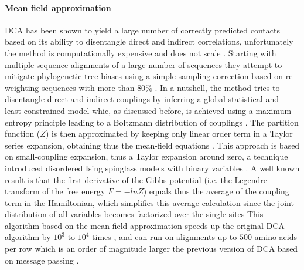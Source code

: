 \paragraph{Mean field approximation}
DCA has been shown to yield a large number of correctly predicted contacts based on its ability to disentangle direct and indirect correlations, unfortunately the method is computationally expensive and does not scale \cite{morcos2011direct}.
Starting with multiple-sequence alignments of a large number of sequences they attempt to mitigate phylogenetic tree biases using a simple sampling correction based on re-weighting  sequences with more than $80\%$ \cite{morcos2011direct}.
In a nutshell, the method tries to disentangle direct and indirect couplings by inferring a global statistical and least-constrained model whic, as discussed before, is achieved using a maximum-entropy principle leading to a Boltzmann distribution of couplings \cite{morcos2011direct}.
The partition function ($Z$) is then approximated by keeping only linear order term in a Taylor series expansion, obtaining thus the mean-field equations \cite{morcos2011direct}.
This approach is based on small-coupling expansion, thus a Taylor expansion around zero, a technique introduced disordered Ising spinglass models with binary variables \cite{morcos2011direct}.
A well known result is that the first derivative of the Gibbs potential (i.e. the Legendre transform of the free energy $F = − ln Z$) equals thus the average of the coupling term in the Hamiltonian, which simplifies this average calculation since the joint distribution of all variables becomes factorized over the single sites \cite{morcos2011direct}
This algorithm based on the mean field approximation speeds up the original DCA algorithm by $10^3$ to $10^4$ times \cite{morcos2011direct}, and can run on alignments up to $500$ amino acids per row which is an order of magnitude larger the previous version of DCA based on message passing \cite{morcos2011direct,weigt2009identification}.

